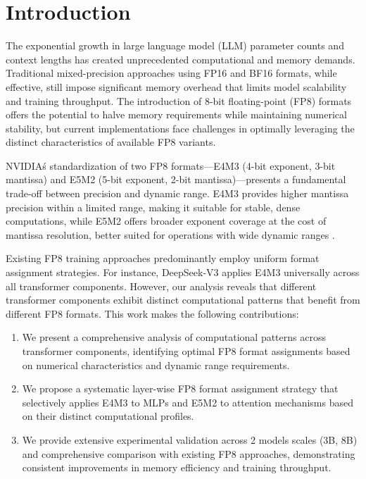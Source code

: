 \documentclass[conference]{IEEEtran}
\begin{document}
\section{Introduction}

The exponential growth in large language model (LLM) parameter counts and context lengths has created unprecedented computational and memory demands. Traditional mixed-precision approaches using FP16 and BF16 formats, while effective, still impose significant memory overhead that limits model scalability and training throughput. The introduction of 8-bit floating-point (FP8) formats \cite{micikevicius2022fp8formatsdeeplearning} offers the potential to halve memory requirements while maintaining numerical stability, but current implementations face challenges in optimally leveraging the distinct characteristics of available FP8 variants.

NVIDIA\'s standardization of two FP8 formats—E4M3 (4-bit exponent, 3-bit mantissa) and E5M2 (5-bit exponent, 2-bit mantissa)—presents a fundamental trade-off between precision and dynamic range. E4M3 provides higher mantissa precision within a limited range, making it suitable for stable, dense computations, while E5M2 offers broader exponent coverage at the cost of mantissa resolution, better suited for operations with wide dynamic ranges \cite{nvidia2022fp8}.

Existing FP8 training approaches predominantly employ uniform format assignment strategies. For instance, DeepSeek-V3 \cite{deepseekv3} applies E4M3 universally across all transformer components. However, our analysis reveals that different transformer components exhibit distinct computational patterns that benefit from different FP8 formats.
This work makes the following contributions:

\begin{enumerate}
\item We present a comprehensive analysis of computational patterns across transformer components, identifying optimal FP8 format assignments based on numerical characteristics and dynamic range requirements.

\item We propose a systematic layer-wise FP8 format assignment strategy that selectively applies E4M3 to MLPs and E5M2 to attention mechanisms based on their distinct computational profiles.

\item We provide extensive experimental validation across 2 models scales (3B, 8B) and comprehensive comparison with existing FP8 approaches, demonstrating consistent improvements in memory efficiency and training throughput.

\end{enumerate}
\end{document}
